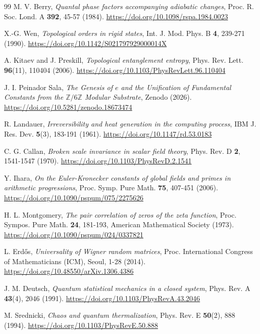 \documentclass[12pt,a4paper]{article}
\theoremstyle{plain}
\theoremstyle{definition}
\theoremstyle{remark}
\begin{document}
\begin{thebibliography}{99}
M. V. Berry, \textit{Quantal phase factors accompanying adiabatic changes}, Proc. R. Soc. Lond. A \textbf{392}, 45-57 (1984). \url{https://doi.org/10.1098/rspa.1984.0023}

X.-G. Wen, \textit{Topological orders in rigid states}, Int. J. Mod. Phys. B \textbf{4}, 239-271 (1990). \url{https://doi.org/10.1142/S021797929000014X}

A. Kitaev and J. Preskill, \textit{Topological entanglement entropy}, Phys. Rev. Lett. \textbf{96}(11), 110404 (2006). \url{https://doi.org/10.1103/PhysRevLett.96.110404}

J. I. Peinador Sala, \textit{The Genesis of $e$ and the Unification of Fundamental Constants from the $\mathbb{Z}/6\mathbb{Z}$ Modular Substrate}, Zenodo (2026). \url{https://doi.org/10.5281/zenodo.18673474}

R. Landauer, \textit{Irreversibility and heat generation in the computing process}, IBM J. Res. Dev. \textbf{5}(3), 183-191 (1961). \url{https://doi.org/10.1147/rd.53.0183}

C. G. Callan, \textit{Broken scale invariance in scalar field theory}, Phys. Rev. D \textbf{2}, 1541-1547 (1970). \url{https://doi.org/10.1103/PhysRevD.2.1541}

Y. Ihara, \textit{On the Euler-Kronecker constants of global fields and primes in arithmetic progressions}, Proc. Symp. Pure Math. \textbf{75}, 407-451 (2006). \url{https://doi.org/10.1090/pspum/075/2275626}

H. L. Montgomery, \textit{The pair correlation of zeros of the zeta function}, Proc. Sympos. Pure Math. \textbf{24}, 181-193, American Mathematical Society (1973). \url{https://doi.org/10.1090/pspum/024/0337821}

L. Erdős, \textit{Universality of Wigner random matrices}, Proc. International Congress of Mathematicians (ICM), Seoul, 1-28 (2014). \url{https://doi.org/10.48550/arXiv.1306.4386}

J. M. Deutsch, \textit{Quantum statistical mechanics in a closed system}, Phys. Rev. A \textbf{43}(4), 2046 (1991). \url{https://doi.org/10.1103/PhysRevA.43.2046}

M. Srednicki, \textit{Chaos and quantum thermalization}, Phys. Rev. E \textbf{50}(2), 888 (1994). \url{https://doi.org/10.1103/PhysRevE.50.888}


\end{thebibliography}
\end{document}
